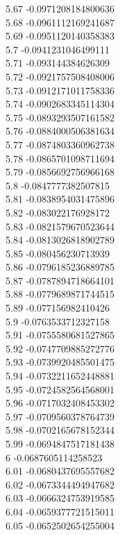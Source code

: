 {5.67	-0.0971208184800636\\
5.68	-0.0961112169241687\\
5.69	-0.0951120140358383\\
5.7	-0.0941231046499111\\
5.71	-0.093144384626309\\
5.72	-0.0921757508408006\\
5.73	-0.0912171011758336\\
5.74	-0.0902683345114304\\
5.75	-0.0893293507161582\\
5.76	-0.0884000506381634\\
5.77	-0.0874803360962738\\
5.78	-0.0865701098711694\\
5.79	-0.0856692756966168\\
5.8	-0.0847777382507815\\
5.81	-0.0838954031475896\\
5.82	-0.083022176928172\\
5.83	-0.0821579670523644\\
5.84	-0.0813026818902789\\
5.85	-0.080456230713939\\
5.86	-0.0796185236889785\\
5.87	-0.0787894718664101\\
5.88	-0.0779689871744515\\
5.89	-0.077156982410426\\
5.9	-0.0763533712327158\\
5.91	-0.0755580681527865\\
5.92	-0.0747709885272776\\
5.93	-0.0739920485501475\\
5.94	-0.0732211652448881\\
5.95	-0.0724582564568001\\
5.96	-0.0717032408453302\\
5.97	-0.0709560378764739\\
5.98	-0.0702165678152344\\
5.99	-0.0694847517181438\\
6	-0.0687605114258523\\
6.01	-0.0680437695557682\\
6.02	-0.0673344494947682\\
6.03	-0.0666324753919585\\
6.04	-0.0659377721515011\\
6.05	-0.0652502654255004\\
}

